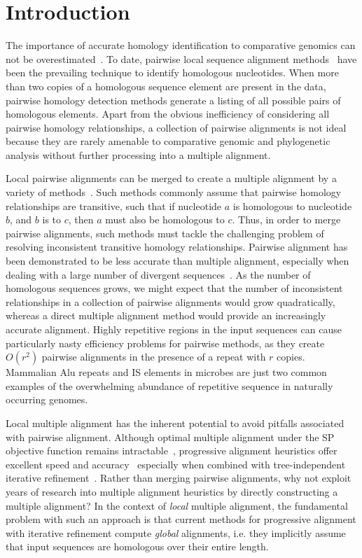 \documentclass[twoside,11pt]{article}
\begin{document}
\section{Introduction}

The importance of accurate homology identification to comparative genomics can not be overestimated~\cite{Kumar07}. To date, pairwise local sequence alignment methods~\cite{ref-blast, ref-ssearch} have been the prevailing technique to identify homologous nucleotides.  When more than two copies of a homologous sequence element are present in the data, pairwise homology detection methods generate a listing of all possible pairs of homologous elements.  Apart from the obvious inefficiency of considering all pairwise homology relationships, a collection of pairwise alignments is not ideal because they are rarely amenable to comparative genomic and phylogenetic analysis without further processing into a multiple alignment.

Local pairwise alignments can be merged to create a multiple alignment by a variety of methods~\cite{ref-tba,ref-aba,ref-dialign,ref-related1}. Such methods commonly assume that pairwise homology relationships are transitive, such that if nucleotide $a$ is homologous to nucleotide $b$, and $b$ is to $c$, then $a$ must also be homologous to $c$.  Thus, in order to merge pairwise alignments, such methods must tackle the challenging problem of resolving inconsistent transitive homology relationships.  Pairwise alignment has been demonstrated to be less accurate than multiple alignment, especially when dealing with a large number of divergent sequences~\cite{ref-mlagan,ref-aubergene}.  As the number of homologous sequences grows, we might expect that the number of inconsistent relationships in a collection of pairwise alignments would grow quadratically, whereas a direct multiple alignment method would provide an increasingly accurate alignment.  Highly repetitive regions in the input sequences can cause particularly nasty efficiency problems for pairwise methods, as they create $O(r^{2})$ pairwise alignments in the presence of a repeat with $r$ copies.  Mammalian Alu repeats and IS elements in microbes are just two common examples of the overwhelming abundance of repetitive sequence in naturally occurring genomes.

Local multiple alignment has the inherent potential to avoid pitfalls associated with pairwise alignment. Although optimal multiple alignment under the SP objective function remains intractable~\cite{ref-wangjiang}, progressive alignment heuristics offer excellent speed and accuracy~\cite{ref-clustalw, ref-tcoffee} especially when combined with tree-independent iterative refinement~\cite{ref-muscle}. Rather than merging pairwise alignments, why not exploit years of research into multiple alignment heuristics by directly constructing a multiple alignment?   In the context of \textit{local} multiple alignment, the fundamental problem with such an approach is that current methods for progressive alignment with iterative refinement compute \textit{global} alignments, i.e. they implicitly assume that input sequences are homologous over their entire length.
\end{document}

